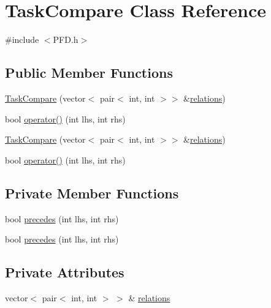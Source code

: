 \hypertarget{classTaskCompare}{\section{Task\-Compare Class Reference}
\label{classTaskCompare}
}


{\ttfamily \#include $<$P\-F\-D.\-h$>$}

\subsection*{Public Member Functions}
\begin{DoxyCompactItemize}
\item 
\hyperlink{classTaskCompare_a7250eabb9b08ceae0bf3c87b2bc6dc39}{Task\-Compare} (vector$<$ pair$<$ int, int $>$$>$ \&\hyperlink{classTaskCompare_ac3bbc9c25373532bdbd74f42830dc652}{relations})
\item 
bool \hyperlink{classTaskCompare_af7f82bae4280a4d8484210cf13035f3f}{operator()} (int lhs, int rhs)
\item 
\hyperlink{classTaskCompare_a7250eabb9b08ceae0bf3c87b2bc6dc39}{Task\-Compare} (vector$<$ pair$<$ int, int $>$$>$ \&\hyperlink{classTaskCompare_ac3bbc9c25373532bdbd74f42830dc652}{relations})
\item 
bool \hyperlink{classTaskCompare_af7f82bae4280a4d8484210cf13035f3f}{operator()} (int lhs, int rhs)
\end{DoxyCompactItemize}
\subsection*{Private Member Functions}
\begin{DoxyCompactItemize}
\item 
bool \hyperlink{classTaskCompare_a6961f7d88cd831a3b2451c68513b892f}{precedes} (int lhs, int rhs)
\item 
bool \hyperlink{classTaskCompare_a6961f7d88cd831a3b2451c68513b892f}{precedes} (int lhs, int rhs)
\end{DoxyCompactItemize}
\subsection*{Private Attributes}
\begin{DoxyCompactItemize}
\item 
vector$<$ pair$<$ int, int $>$ $>$ \& \hyperlink{classTaskCompare_ac3bbc9c25373532bdbd74f42830dc652}{relations}
\end{DoxyCompactItemize}


